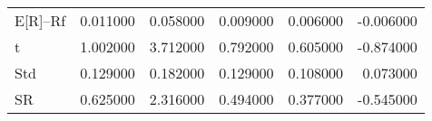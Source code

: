 \begin{tabular}{lrrrrr}
\toprule
\midrule
E[R]--Rf & 0.011000 & 0.058000 & 0.009000 & 0.006000 & -0.006000 \\
t & 1.002000 & 3.712000 & 0.792000 & 0.605000 & -0.874000 \\
Std & 0.129000 & 0.182000 & 0.129000 & 0.108000 & 0.073000 \\
SR & 0.625000 & 2.316000 & 0.494000 & 0.377000 & -0.545000 \\
\bottomrule
\end{tabular}
